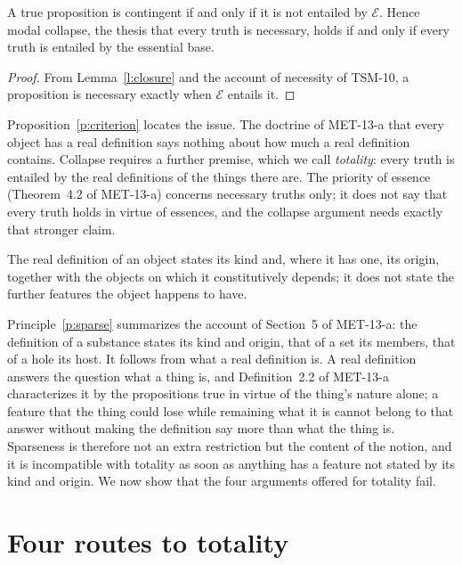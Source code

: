\documentclass{situationist-preprint}
\begin{document}
\begin{proposition}[Criterion]\label{p:criterion}
A true proposition is contingent if and only if it is not entailed by $\mathcal{E}$. Hence modal collapse, the thesis that every truth is necessary, holds if and only if every truth is entailed by the essential base.
\end{proposition}

\begin{proof}
From Lemma~\ref{l:closure} and the account of necessity of TSM-10, a proposition is necessary exactly when $\mathcal{E}$ entails it.
\end{proof}

Proposition~\ref{p:criterion} locates the issue. The doctrine of MET-13-a that every object has a real definition says nothing about how much a real definition contains. Collapse requires a further premise, which we call \emph{totality}: every truth is entailed by the real definitions of the things there are. The priority of essence (Theorem~4.2 of MET-13-a) concerns necessary truths only; it does not say that every truth holds in virtue of essences, and the collapse argument needs exactly that stronger claim.

\begin{principle}[Sparseness]\label{p:sparse}
The real definition of an object states its kind and, where it has one, its origin, together with the objects on which it constitutively depends; it does not state the further features the object happens to have.
\end{principle}

Principle~\ref{p:sparse} summarizes the account of Section~5 of MET-13-a: the definition of a substance states its kind and origin, that of a set its members, that of a hole its host. It follows from what a real definition is. A real definition answers the question what a thing is, and Definition~2.2 of MET-13-a characterizes it by the propositions true in virtue of the thing's nature alone; a feature that the thing could lose while remaining what it is cannot belong to that answer without making the definition say more than what the thing is. Sparseness is therefore not an extra restriction but the content of the notion, and it is incompatible with totality as soon as anything has a feature not stated by its kind and origin. We now show that the four arguments offered for totality fail.

\section{Four routes to totality}\label{s:routes}
\end{document}
